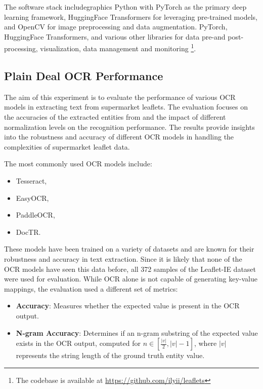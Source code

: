 \documentclass[11pt]{article}
\begin{document}
The software stack includegraphics Python with PyTorch as the primary deep learning framework, HuggingFace Transformers for leveraging pre-trained models, and OpenCV for image preprocessing and data augmentation.
 PyTorch, HuggingFace Transformers, and various other libraries for data pre-and post-processing, visualization, data management and monitoring \footnote{The codebase is available at \href{https://github.com/ilyii/leaflets}{https://github.com/ilyii/leaflets}}.


\subsection{Plain Deal OCR Performance}
The aim of this experiment is to evaluate the performance of various OCR models in extracting text from supermarket leaflets. The evaluation focuses on the accuracies of the extracted entities from  and the impact of different normalization levels on the recognition performance. The results provide insights into the robustness and accuracy of different OCR models in handling the complexities of supermarket leaflet data.

The most commonly used OCR models include:
\begin{itemize}
    \item Tesseract,
    \item EasyOCR,
    \item PaddleOCR,
    \item DocTR.
\end{itemize}
These models have been trained on a variety of datasets and are known for their robustness and accuracy in text extraction. Since it is likely that none of the OCR models have seen this data before, all 372 samples of the Leaflet-IE dataset were used for evaluation. While OCR alone is not capable of generating key-value mappings, the evaluation used a different set of metrics:

\begin{itemize}
    \item \textbf{Accuracy}: Measures whether the expected value is present in the OCR output.
    \item \textbf{N-gram Accuracy}: Determines if an n-gram substring of the expected value exists in the OCR output, computed for \(n \in \left[\frac{|v|}{2}, |v| - 1\right]\), where \(|v|\) represents the string length of the ground truth entity value.
\end{itemize}
\end{document}
